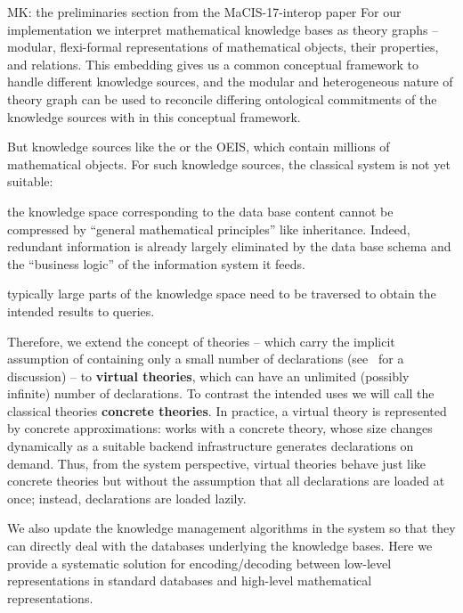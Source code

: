 \begin{newpart}{MK: the preliminaries section from the MaCIS-17-interop paper}
For our implementation we interpret mathematical knowledge bases as \ommt theory graphs -- modular, flexi-formal representations of mathematical objects, their properties, and relations. 
This embedding gives us a common conceptual framework to handle different knowledge sources, and the modular and heterogeneous nature of \ommt theory graph can be used to reconcile differing ontological commitments of the knowledge sources with in this conceptual framework.


But knowledge sources like the \lmfdb or the OEIS, which contain millions of mathematical objects. For such knowledge sources, the classical \mmt system is not yet suitable:
\begin{compactitem}
\item the knowledge space corresponding to the data base content cannot be compressed by ``general mathematical principles'' like inheritance. 
Indeed, redundant information is already largely eliminated by the data base schema and the ``business logic'' of the information system it feeds.
\item typically large parts of the knowledge space need to be traversed to obtain the intended results to queries.
\end{compactitem}
Therefore, we extend the concept of \ommt theories -- which carry the implicit assumption of containing only a small number of declarations (see~\cite{FaGu:lt92} for a discussion) -- to \textbf{virtual theories}, which can have an unlimited (possibly infinite) number of declarations. 
To contrast the intended uses we will call the classical \ommt theories \textbf{concrete theories}.  
In practice, a virtual theory is represented by concrete approximations: \ommt works with
a concrete theory, whose size changes dynamically as a suitable backend infrastructure
generates declarations on demand.
Thus, from the system perspective, virtual theories behave just like concrete theories but without the assumption that all declarations are loaded at once; instead, declarations  are loaded lazily.

We also update the knowledge management algorithms in the \mmt system so that they can directly deal with the databases underlying the knowledge bases.
Here we provide a systematic solution for encoding/decoding between low-level representations in standard databases and high-level mathematical representations.



\end{newpart}
